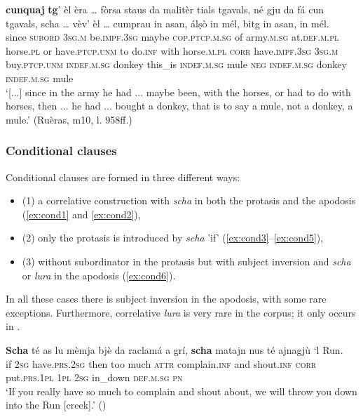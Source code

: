 \ea
\label{ex:caus7}
\gll [...] \textbf{cunquaj} \textbf{tg}' èl èra … fòrsa staus da malitèr tials tgavals, né gju da fá cun tgavals, scha … vèv’ èl … cumprau in asan, álṣò in mél, bitg in asan, in mél.\\
{} since \textsc{subord} \textsc{3sg.m} be.\textsc{impf.3sg} {} maybe \textsc{cop.ptcp.m.sg} of army.\textsc{m.sg} at.\textsc{def.m.pl} horse.\textsc{pl} or have.\textsc{ptcp.unm}  to do.\textsc{inf} with horse.\textsc{m.pl} \textsc{corr} {} have.\textsc{impf.3sg} \textsc{3sg.m} {}  buy.\textsc{ptcp.unm}  \textsc{indef.m.sg} donkey this\_is \textsc{indef.m.sg} mule \textsc{neg} \textsc{indef.m.sg} donkey \textsc{indef.m.sg} mule \\
\glt `[...] since in the army he had ... maybe been, with the horses, or had to do with horses, then ... he had ... bought a donkey, that is to say a mule, not a donkey, a mule.' (Ruèras, m10, l. 958ff.)
\z

\subsubsection{Conditional clauses}
Conditional clauses are formed in three different ways:

\begin{itemize}
	\item (1) a correlative construction with \textit{scha} in both the protasis and the apodosis (\ref{ex:cond1} and \ref{ex:cond2}), 
	\item (2) only the protasis is introduced by \textit{scha} 'if' (\ref{ex:cond3}--\ref{ex:cond5}),
	\item (3) without subordinator in the protasis but with subject inversion and \textit{scha} or \textit{lura} in the apodosis (\ref{ex:cond6}).
\end{itemize}

In all these cases there is subject inversion in the apodosis, with some rare exceptions. Furthermore, correlative \textit{lura} is very rare in the corpus; it only occurs in \citet{Büchli1966}.

\ea
\label{ex:cond1}
\gll \textbf{Scha} té as lu mèmja bjè da raclamá a grí, \textbf{scha} matajn nus té ajnagjù ‘l Run.\\
if \textsc{2sg} have.\textsc{prs.2sg} then too much \textsc{attr} complain.\textsc{inf} and shout.\textsc{inf} \textsc{corr} put.\textsc{prs.1pl} \textsc{1pl} \textsc{2sg} in\_down \textsc{def.m.sg} \textsc{pn}\\
\glt `If you really have so much to complain and shout about, we will throw you down into the Run [creek].' (\citealt[120]{Berther1998})
\z

